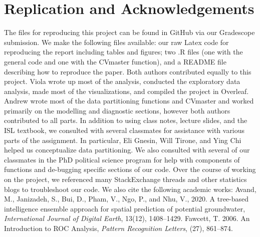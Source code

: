 \documentclass[12pt]{article}
\begin{document}
\section{Replication and Acknowledgements}
The files for reproducing this project can be found in GitHub via our Gradescope submission. We make the following files available: our raw Latex code for reproducing the report including tables and figures; two .R files (one with the general code and one with the CVmaster function), and a README file describing how to reproduce the paper. 
\newline
\newline 
Both authors contributed equally to this project. Viola wrote up most of the analysis, conducted the exploratory data analysis, made most of the visualizations, and compiled the project in Overleaf. Andrew wrote most of the data partitioning functions and CVmaster and worked primarily on the modelling and diagnostic sections, however both authors contributed to all parts. In addition to using class notes, lecture slides, and the ISL textbook, we consulted with several classmates for assistance with various parts of the assignment. In particular, Eli Gnesin, Will Tirone, and Ying Chi helped us conceptualize data partitioning. We also consulted with several of our classmates in the PhD political science program for help with components of functions and de-bugging specific sections of our code. Over the course of working on the project, we referenced many StackExchange threads and other statistics blogs to troubleshoot our code. We also cite the following academic works: 
\newline
\newline
Avand, M., Janizadeh, S., Bui, D., Pham, V., Ngo, P., and Nhu, V., 2020. A tree-based intelligence ensemble approach for spatial prediction of potential groundwater, \textit{International Journal of Digital Earth}, 13(12), 1408--1429.
\newline
\newline
Fawcett, T. 2006. An Introduction to ROC Analysis, \textit{Pattern Recognition Letters}, (27), 861--874. 
\end{document}
